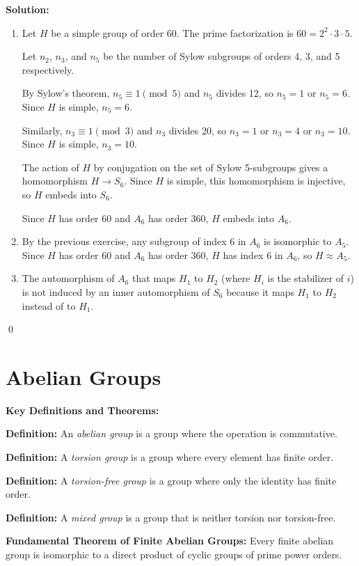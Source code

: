 \noindent\textbf{Solution:}
\begin{enumerate}[label=(\alph*)]
\item Let $H$ be a simple group of order 60. The prime factorization is $60 = 2^2 \cdot 3 \cdot 5$.

Let $n_2$, $n_3$, and $n_5$ be the number of Sylow subgroups of orders 4, 3, and 5 respectively.

By Sylow's theorem, $n_5 \equiv 1 \pmod{5}$ and $n_5$ divides 12, so $n_5 = 1$ or $n_5 = 6$. Since $H$ is simple, $n_5 = 6$.

Similarly, $n_3 \equiv 1 \pmod{3}$ and $n_3$ divides 20, so $n_3 = 1$ or $n_3 = 4$ or $n_3 = 10$. Since $H$ is simple, $n_3 = 10$.

The action of $H$ by conjugation on the set of Sylow 5-subgroups gives a homomorphism $H \to S_6$. Since $H$ is simple, this homomorphism is injective, so $H$ embeds into $S_6$.

Since $H$ has order 60 and $A_6$ has order 360, $H$ embeds into $A_6$.

\item By the previous exercise, any subgroup of index 6 in $A_6$ is isomorphic to $A_5$. Since $H$ has order 60 and $A_6$ has order 360, $H$ has index 6 in $A_6$, so $H \approx A_5$.

\item The automorphism of $A_6$ that maps $H_1$ to $H_2$ (where $H_i$ is the stabilizer of $i$) is not induced by an inner automorphism of $S_6$ because it maps $H_1$ to $H_2$ instead of to $H_1$.
\end{enumerate}


\qed
\section{Abelian Groups}

\textbf{Key Definitions and Theorems:}

\textbf{Definition:} An \textit{abelian group} is a group where the operation is commutative.

\textbf{Definition:} A \textit{torsion group} is a group where every element has finite order.

\textbf{Definition:} A \textit{torsion-free group} is a group where only the identity has finite order.

\textbf{Definition:} A \textit{mixed group} is a group that is neither torsion nor torsion-free.

\textbf{Fundamental Theorem of Finite Abelian Groups:} Every finite abelian group is isomorphic to a direct product of cyclic groups of prime power orders.

